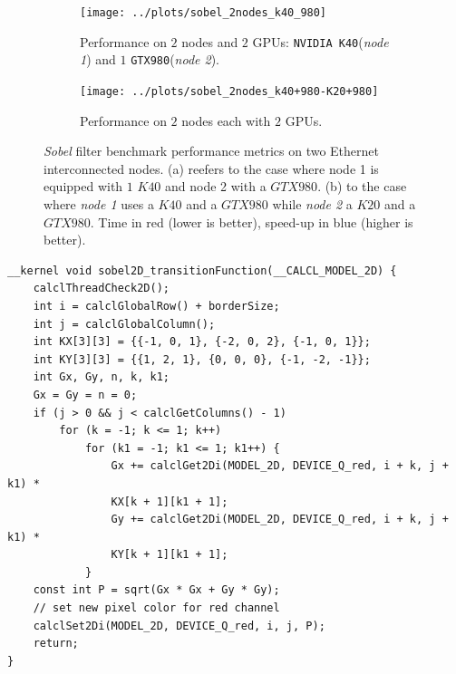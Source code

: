 \begin{figure}[!htb]
	\begin{subfigure}{1.0\textwidth}
		\caption{Performance on $2$ nodes and $2$ GPUs: \texttt{NVIDIA K40}(\textit{node 1}) and $1$ \texttt{GTX980}(\textit{node 2}).}
		\label{fig:sobel_2nodes_k40_980}
		\texttt{[image: ../plots/sobel\_2nodes\_k40\_980]}
		
	\end{subfigure}        
	\endminipage \hfill
	\vspace{5mm}
	\begin{subfigure}{1.0\textwidth}
		\texttt{[image: ../plots/sobel\_2nodes\_k40+980-K20+980]}
		\caption{Performance on $2$ nodes each with $2$ GPUs.}
		\label{fig:sobel_2nodes_k40+980-K20+980}
	\end{subfigure}
	\endminipage\hfill
	\caption[\textit{Sobel} filter benchmark performance metrics on two nodes.]{\textit{Sobel} filter benchmark performance metrics on two Ethernet interconnected nodes. (a) reefers to the case where node 1 is equipped with $1$ $K40$ and node 2 with a $GTX980$. (b) to the case where \textit{node 1} uses a $K40$ and a $GTX980$ while \textit{node 2} a $K20$ and a $GTX980$. Time in red (lower is better), speed-up in blue (higher is better).}
	\label{fig:sobel_2nodes_performance}
\end{figure}
\begin{minipage}{1.0\textwidth}


\begin{lstlisting}
__kernel void sobel2D_transitionFunction(__CALCL_MODEL_2D) {
	calclThreadCheck2D();
	int i = calclGlobalRow() + borderSize;
	int j = calclGlobalColumn();
	int KX[3][3] = {{-1, 0, 1}, {-2, 0, 2}, {-1, 0, 1}};
	int KY[3][3] = {{1, 2, 1}, {0, 0, 0}, {-1, -2, -1}};
	int Gx, Gy, n, k, k1;
	Gx = Gy = n = 0;
	if (j > 0 && j < calclGetColumns() - 1)
		for (k = -1; k <= 1; k++)
			for (k1 = -1; k1 <= 1; k1++) {
				Gx += calclGet2Di(MODEL_2D, DEVICE_Q_red, i + k, j + k1) *
				KX[k + 1][k1 + 1];
				Gy += calclGet2Di(MODEL_2D, DEVICE_Q_red, i + k, j + k1) *
				KY[k + 1][k1 + 1];
			}
	const int P = sqrt(Gx * Gx + Gy * Gy);
	// set new pixel color for red channel
	calclSet2Di(MODEL_2D, DEVICE_Q_red, i, j, P);
	return;
}
\end{lstlisting}
\end{minipage}